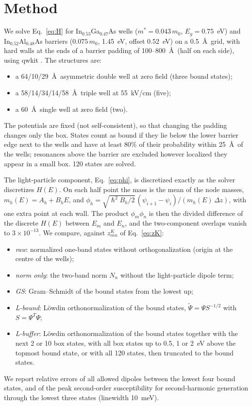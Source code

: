 \documentclass[11pt]{article}
\begin{document}
\section{Method}
We solve Eq.~\eqref{eq:H} for In$_{0.53}$Ga$_{0.47}$As wells ($m^*=0.043\,m_0$, $E_g=0.75$~eV) and In$_{0.52}$Al$_{0.48}$As barriers ($0.075\,m_0$, 1.45~eV, offset 0.52~eV) on a 0.5~\AA\ grid, with hard walls at the ends of a barrier padding of 100--800~\AA\ (half on each side), using qwkit \cite{qwkit}. The structures are:
\begin{itemize}
\item a 64/10/29~\AA\ asymmetric double well at zero field (three bound states);
\item a 58/14/34/14/58~\AA\ triple well at 55~kV/cm (five);
\item a 60~\AA\ single well at zero field (two).
\end{itemize}
The potentials are fixed (not self-consistent), so that changing the padding changes only the box. States count as bound if they lie below the lower barrier edge next to the wells and have at least 80\% of their probability within 25~\AA\ of the wells; resonances above the barrier are excluded however localized they appear in a small box. 120 states are solved.

The light-particle component, Eq.~\eqref{eq:phi}, is discretized exactly as the solver discretizes $H(E)$. On each half point the mass is the mean of the node masses, $m_h(E)=A_h+B_hE$, and $\phi_h=\sqrt{\hslash^2B_h/2}\,(\psi_{i+1}-\psi_i)/(m_h(E)\,\Delta z)$, with one extra point at each wall. The product $\phi_m\phi_n$ is then the divided difference of the discrete $H(E)$ between $E_m$ and $E_n$, and the two-component overlaps vanish to $3\times10^{-13}$. We compare, against $z^K_{mn}$ of Eq.~\eqref{eq:zK}:
\begin{itemize}
\item \emph{raw}: normalized one-band states without orthogonalization (origin at the centre of the wells);
\item \emph{norm only}: the two-band norm $N_n$ without the light-particle dipole term;
\item \emph{GS}: Gram--Schmidt of the bound states from the lowest up;
\item \emph{L-bound}: L\"owdin orthonormalization of the bound states, $\tilde\Psi=\Psi S^{-1/2}$ with $S=\Psi^T\Psi$;
\item \emph{L-buffer}: L\"owdin orthonormalization of the bound states together with the next 2 or 10 box states, with all box states up to 0.5, 1 or 2~eV above the topmost bound state, or with all 120 states, then truncated to the bound states.
\end{itemize}
We report relative errors of all allowed dipoles between the lowest four bound states, and of the peak second-order susceptibility for second-harmonic generation through the lowest three states (linewidth 10~meV).
\end{document}
